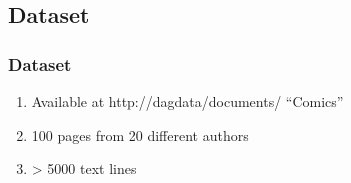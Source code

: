 \documentclass[9pt]{beamer}
\begin{document}
	\subsection[Dataset]{Dataset}
	\begin{frame}
		\frametitle{Dataset}
		\begin{center}	
		  \vspace{1em}
		\end{center}
		\begin{block}{}
			\begin{enumerate}
				\item Available at http://dagdata/documents/ ``Comics''
				\item 100 pages from 20 different authors
				\item > 5000 text lines
			\end{enumerate}					
		\end{block}
		

	\end{frame}
	
\end{document}
